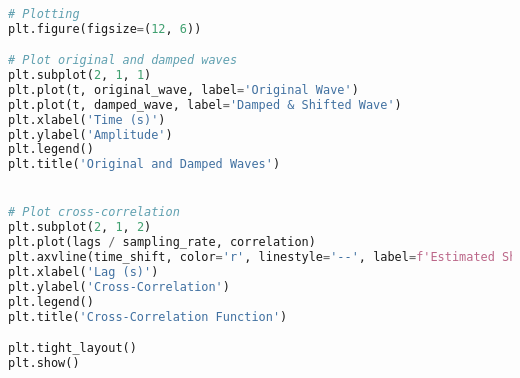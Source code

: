 \documentclass{article}
\begin{document}
\begin{lstlisting}[language=Python, caption=Plotting for Visualization of Results]
	
	
# Plotting
plt.figure(figsize=(12, 6))

# Plot original and damped waves
plt.subplot(2, 1, 1)
plt.plot(t, original_wave, label='Original Wave')
plt.plot(t, damped_wave, label='Damped & Shifted Wave')
plt.xlabel('Time (s)')
plt.ylabel('Amplitude')
plt.legend()
plt.title('Original and Damped Waves')


# Plot cross-correlation
plt.subplot(2, 1, 2)
plt.plot(lags / sampling_rate, correlation)
plt.axvline(time_shift, color='r', linestyle='--', label=f'Estimated Shift = {time_shift:.4f} s')
plt.xlabel('Lag (s)')
plt.ylabel('Cross-Correlation')
plt.legend()
plt.title('Cross-Correlation Function')

plt.tight_layout()
plt.show()
     																										##
     																										##
     																										##
		
\end{lstlisting}
	
\end{document}
